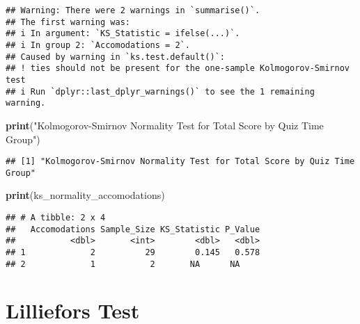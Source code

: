 \documentclass[
]{article}
\newenvironment{Shaded}{\begin{snugshade}}{\end{snugshade}}
\newcommand{\FunctionTok}[1]{\textcolor[rgb]{0.13,0.29,0.53}{\textbf{#1}}}
\newcommand{\NormalTok}[1]{#1}
\newcommand{\StringTok}[1]{\textcolor[rgb]{0.31,0.60,0.02}{#1}}
\begin{document}
\begin{verbatim}
## Warning: There were 2 warnings in `summarise()`.
## The first warning was:
## i In argument: `KS_Statistic = ifelse(...)`.
## i In group 2: `Accomodations = 2`.
## Caused by warning in `ks.test.default()`:
## ! ties should not be present for the one-sample Kolmogorov-Smirnov test
## i Run `dplyr::last_dplyr_warnings()` to see the 1 remaining warning.
\end{verbatim}

\begin{Shaded}
\begin{Highlighting}[]
\FunctionTok{print}\NormalTok{(}\StringTok{"Kolmogorov{-}Smirnov Normality Test for Total Score by Quiz Time Group"}\NormalTok{)}
\end{Highlighting}
\end{Shaded}

\begin{verbatim}
## [1] "Kolmogorov-Smirnov Normality Test for Total Score by Quiz Time Group"
\end{verbatim}

\begin{Shaded}
\begin{Highlighting}[]
\FunctionTok{print}\NormalTok{(ks\_normality\_accomodations)}
\end{Highlighting}
\end{Shaded}

\begin{verbatim}
## # A tibble: 2 x 4
##   Accomodations Sample_Size KS_Statistic P_Value
##           <dbl>       <int>        <dbl>   <dbl>
## 1             2          29        0.145   0.578
## 2             1           2       NA      NA
\end{verbatim}

\section{Lilliefors Test}\label{lilliefors-test}
\end{document}
